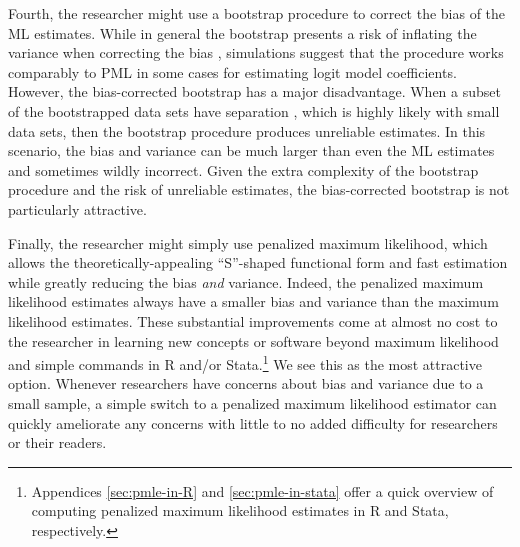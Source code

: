 \documentclass[12pt]{article}
\begin{document}
Fourth, the researcher might use a bootstrap procedure \citep{Efron1979} to correct the bias of the ML estimates. While in general the bootstrap presents a risk of inflating the variance when correcting the bias \citep[esp. pp. 138-139]{EfronTibshirani1993}, simulations suggest that the procedure works comparably to PML in some cases for estimating logit model coefficients. However, the bias-corrected bootstrap has a major disadvantage. When a subset of the bootstrapped data sets have separation \citep{Zorn2005}, which is highly likely with small data sets, then the bootstrap procedure produces unreliable estimates. In this scenario, the bias and variance can be much larger than even the ML estimates and sometimes wildly incorrect. Given the extra complexity of the bootstrap procedure and the risk of unreliable estimates, the bias-corrected bootstrap is not particularly attractive.

Finally, the researcher might simply use penalized maximum likelihood, which allows the theoretically-appealing ``S''-shaped functional form and fast estimation while greatly reducing the bias \textit{and} variance.
Indeed, the penalized maximum likelihood estimates always have a smaller bias and variance than the maximum likelihood estimates.
These substantial improvements come at almost no cost to the researcher in learning new concepts or software beyond maximum likelihood and simple commands in R and/or Stata.\footnote{Appendices \ref{sec:pmle-in-R} and \ref{sec:pmle-in-stata} offer a quick overview of computing penalized maximum likelihood estimates in R and Stata, respectively.}
We see this as the most attractive option.
Whenever researchers have concerns about bias and variance due to a small sample, a simple switch to a penalized maximum likelihood estimator can quickly ameliorate any concerns with little to no added difficulty for researchers or their readers.

\singlespace
\normalsize


%
\end{document}
